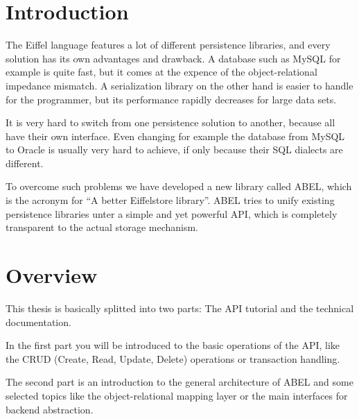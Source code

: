 \section{Introduction}

The Eiffel language \cite{EcmaEiffel} \cite{Meyer09} features a lot of different persistence libraries, and every solution has its own advantages and drawback.
A database such as MySQL \cite {MySQL} for example is quite fast, but it comes at the expence of the object-relational impedance mismatch.\cite{ORImpedance}
A serialization library on the other hand is easier to handle for the programmer, but its performance rapidly decreases for large data sets.

It is very hard to switch from one persistence solution to another, because all have their own interface.
Even changing for example the database from MySQL to Oracle \cite{Oracle} is usually very hard to achieve, if only because their SQL dialects are different.

To overcome such problems we have developed a new library called ABEL, which is the acronym for ``A better Eiffelstore library''.
ABEL tries to unify existing persistence libraries unter a simple and yet powerful API, which is completely transparent to the actual storage mechanism.


\section{Overview}
This thesis is basically splitted into two parts: The API tutorial and the technical documentation.

In the first part you will be introduced to the basic operations of the API, like the CRUD (Create, Read, Update, Delete) operations or transaction handling.

The second part is an introduction to the general architecture of ABEL and some selected topics like the object-relational mapping layer or the main interfaces for backend abstraction.